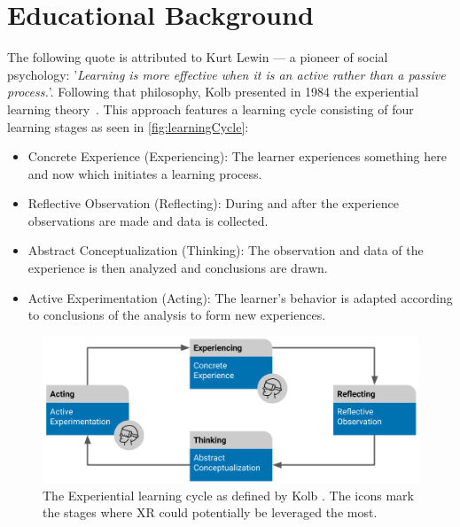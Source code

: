 %
\chapter{Educational Background}
\label{sec:concepts}

The following quote is attributed to Kurt Lewin --- a pioneer of social psychology: '\emph{Learning is more effective when it is an active rather than a passive process.}'. Following that philosophy, Kolb presented in 1984 the experiential learning theory~\cite{kolb:1984:experiential}.
This approach features a learning cycle consisting of four learning stages as seen in \autoref{fig:learningCycle}:

\begin{itemize}
    \vspace{-0.3cm}\item Concrete Experience (Experiencing): The learner experiences something here and now which initiates a learning process.
    \vspace{-0.3cm}\item Reflective Observation (Reflecting): During and after the experience observations are made and data is collected.
    \vspace{-0.3cm}\item Abstract Conceptualization (Thinking): The observation and data of the experience is then analyzed and conclusions are drawn.
    \vspace{-0.3cm}\item Active Experimentation (Acting): The learner's behavior is adapted according to conclusions of the analysis to form new experiences. 
\end{itemize}

\begin{figure}[h!bt]
	\centering
	\includegraphics[width=0.9\linewidth]{pictures/ExperientialLearningCycle2.png}
	\captionsetup{labelfont=bf,textfont=it}
	\caption{The Experiential learning cycle as defined by Kolb \cite{kolb:1984:experiential}. The icons mark the stages where XR could potentially be leveraged the most.\label{fig:learningCycle}}
\end{figure}


